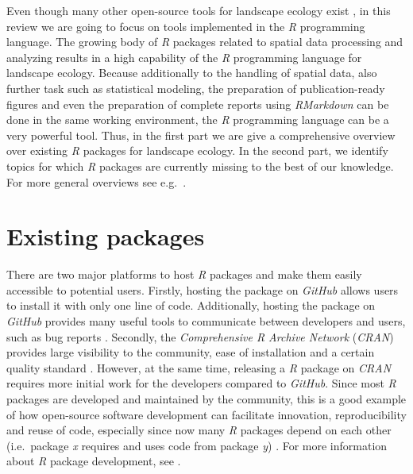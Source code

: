 \documentclass[smallextended]{svjour3}       %
\begin{document}
Even though many other open-source tools for landscape ecology exist \cite{QGISDevelopmentTeam2016,GRASSDevelopmentTeam2017,Porta2017}, in this review we are going to focus on tools implemented in the \emph{R} programming language.
The growing body of \emph{R} packages related to spatial data processing and analyzing results in a high capability of the \emph{R} programming language for landscape ecology.
Because additionally to the handling of spatial data, also further task such as statistical modeling, the preparation of publication-ready figures and even the preparation of complete reports using \emph{RMarkdown} \cite{Xie2018} can be done in the same working environment, the \emph{R} programming language can be a very powerful tool.
Thus, in the first part we are give a comprehensive overview over existing \emph{R} packages for landscape ecology.
In the second part, we identify topics for which \emph{R} packages are currently missing to the best of our knowledge.
For more general overviews see e.g.~\cite{Jolma2008,Steiniger2009,Steiniger2009a,Istvan2012}.

\hypertarget{sec:existing_packages}{%
\section{Existing packages}\label{sec:existing_packages}}

There are two major platforms to host \emph{R} packages and make them easily accessible to potential users.
Firstly, hosting the package on \emph{GitHub} allows users to install it with only one line of code.
Additionally, hosting the package on \emph{GitHub} provides many useful tools to communicate between developers and users, such as bug reports \cite{Wickham2015}.
Secondly, the \emph{Comprehensive R Archive Network} (\emph{CRAN}) provides large visibility to the community, ease of installation and a certain quality standard \cite{Wickham2015}.
However, at the same time, releasing a \emph{R} package on \emph{CRAN} requires more initial work for the developers compared to \emph{GitHub}.
Since most \emph{R} packages are developed and maintained by the community, this is a good example of how open-source software development can facilitate innovation, reproducibility and reuse of code, especially since now many \emph{R} packages depend on each other (i.e.~package \emph{x} requires and uses code from package \emph{y}) \cite{vonKrogh2006,St.Laurent2008,Steiniger2009,Prlic2012,Powers2019}.
For more information about \emph{R} package development, see \cite{Wickham2015}.
\end{document}

